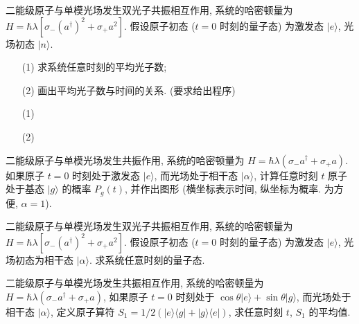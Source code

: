 \documentclass{assignment}
\begin{document}
\begin{prob}
    二能级原子与单模光场发生双光子共振相互作用, 系统的哈密顿量为 $H=\hbar\lambda[\sigma_-(a^{\dagger})^2+\sigma_+a^2]$. 假设原子初态 ($t=0$ 时刻的量子态) 为激发态 $\lvert e\rangle$, 光场初态 $\lvert n\rangle$.
    \begin{itemize}
        \item[(1)] 求系统任意时刻的平均光子数;
        \item[(2)] 画出平均光子数与时间的关系. (要求给出程序)
    \end{itemize}
\end{prob}
\begin{sol}
    \begin{itemize}
        \item[(1)] 
        \item[(2)] 
    \end{itemize}
\end{sol}

\begin{prob}
    二能级原子与单模光场发生共振作用, 系统的哈密顿量为 $H=\hbar\lambda(\sigma_-a^{\dagger}+\sigma_+a)$. 如果原子 $t=0$ 时刻处于激发态 $\lvert e\rangle$, 而光场处于相干态 $\lvert\alpha\rangle$, 计算任意时刻 $t$ 原子处于基态 $\lvert g\rangle$ 的概率 $P_g(t)$, 并作出图形 (横坐标表示时间, 纵坐标为概率. 为方便, $\alpha=1$).
\end{prob}
\begin{sol}
    
\end{sol}

\begin{prob}
    二能级原子与单模光场发生双光子共振相互作用, 系统的哈密顿量为 $H=\hbar\lambda[\sigma_-(a^{\dagger})^2+\sigma_+a^2]$. 假设原子初态 ($t=0$ 时刻的量子态) 为激发态 $\lvert e\rangle$, 光场初态为相干态 $\lvert\alpha\rangle$. 求系统任意时刻的量子态.
\end{prob}
\begin{sol}
    
\end{sol}

\begin{prob}
    二能级原子与单模光场发生共振相互作用, 系统的哈密顿量为 $H=\hbar\lambda(\sigma_-a^{\dagger}+\sigma_+a)$, 如果原子 $t=0$ 时刻处于 $\cos\theta\lvert e\rangle+\sin\theta\lvert g\rangle$, 而光场处于相干态 $\lvert\alpha\rangle$, 定义原子算符 $S_1=1/2(\lvert e\rangle\langle g\rvert+\lvert g\rangle\langle e\rvert)$, 求任意时刻 $t$, $S_1$ 的平均值.
\end{prob}
\begin{sol}
    
\end{sol}
\end{document}
